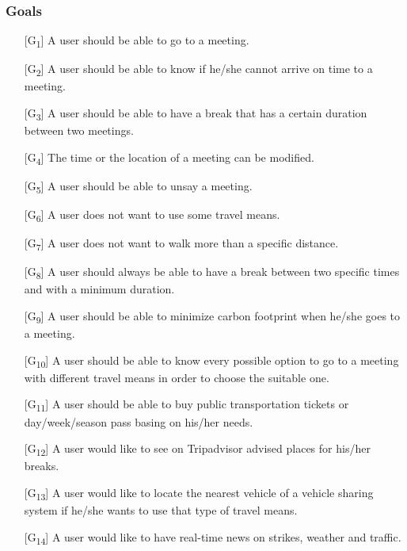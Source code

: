 \documentclass[12pt,titlepage]{article}
\begin{document}
\subsubsection{Goals}\label{RASD}
\begin{itemize}

\item [{[G\textsubscript{1}]}]	A user should be able to go to a meeting.
\item [{[G\textsubscript{2}]}]	A user should be able to know if he/she cannot arrive on time to a meeting.
\item [{[G\textsubscript{3}]}]	A user should be able to have a break that has a certain duration between two meetings.
\item [{[G\textsubscript{4}]}]	The time or the location of a meeting can be modified.

\item [{[G\textsubscript{5}]}]  A user should be able to unsay  a meeting.
\item [{[G\textsubscript{6}]}]	A user does not want to use some travel means.
\item [{[G\textsubscript{7}]}]	A user does not want to walk more than a specific distance.
\item [{[G\textsubscript{8}]}] A user should always be able to have a break between two specific times and with a minimum duration.
\item [{[G\textsubscript{9}]}] A user should be able to minimize carbon footprint when he/she goes to a meeting.
\item [{[G\textsubscript{10}]}] A user should be able to know every possible option to go to a meeting with different travel means in order to choose the suitable one.
\item [{[G\textsubscript{11}]}]	A user should be able to buy public transportation tickets or day/week/season pass basing on his/her needs.
\item [{[G\textsubscript{12}]}]	A user would like to see on Tripadvisor advised places for his/her breaks.
\item [{[G\textsubscript{13}]}]	A user would like to locate the nearest vehicle of a vehicle sharing system if he/she wants to use that type of travel means.
\item [{[G\textsubscript{14}]}]	A user would like to have real-time news on strikes, weather and traffic.

 \end{itemize}
\end{document}
